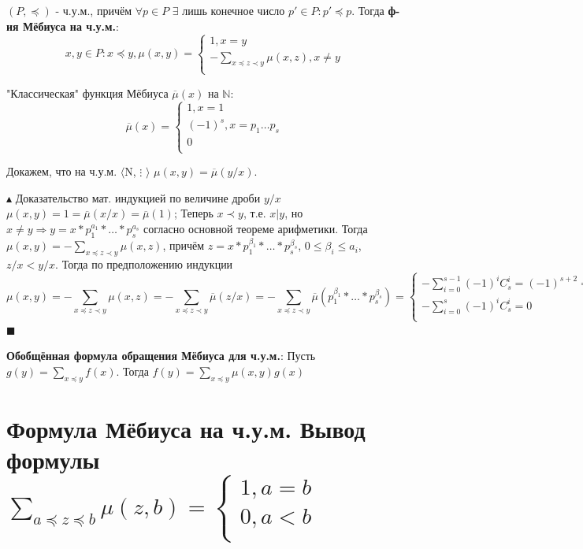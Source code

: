 $(P, \preceq)$ - ч.у.м., причём $\forall p \in P$  $\exists$ лишь конечное число $p' \in P: p' \preceq p$. Тогда \textbf{ф-ия Мёбиуса на ч.у.м.}: \[x, y \in P: x \preceq y, \mu(x, y) = \left\{
  \begin{array}{ccc}
    1, x = y \\
    - \sum_{x \preceq z \prec y} \mu(x, z), x \neq y\\
  \end{array}
\right. \] \par
"Классическая"  функция Мёбиуса $\overline{\mu}(x)$ на $ \mathbb{N}$:
\[ 
\overline{\mu}(x)= \left\{
  \begin{array}{ccc}
    1, x = 1 \\
    (-1)^s, x = p_1\dots p_ s\\
    0 \\
  \end{array}
\right.
\] \par
Докажем, что на ч.у.м. $\langle$N, $\vdots$ $\rangle$ $\mu (x, y) = \overline{\mu}(y/x)$. \par
$\blacktriangle$
Доказательство мат. индукцией по величине дроби $y/x$
$\mu (x, y) = 1 = \overline{\mu}(x/x) = \overline{\mu}(1)$;
Теперь $x \prec y$, т.е. $x|y$, но $x \neq y \Rightarrow y = x*p_1^{a_1}*\dots*p_s^{a_s}$ согласно основной теореме арифметики. Тогда 
$ \mu(x, y) = - \sum_{x \preceq z \prec y} \mu(x, z) $, причём $z = x*p_1^{\beta_1}*\dots*p_s^{\beta_s}$, $0 \leqslant \beta_i \leqslant a_i$, $z/x < y/x$. Тогда по предположению индукции 
\[ \mu(x, y) = - \sum_{x \preceq z \prec y} \mu(x, z) = - \sum_{x \preceq z \prec y} \overline{\mu}(z/x) = - \sum_{x \preceq z \prec y} \overline{\mu}(p_1^{\beta_1}*\dots*p_s^{\beta_s}) = \left\{
  \begin{array}{ccc}
   -\sum_{i=0}^{s-1} (-1)^iC_s^i = (-1)^{s+2} = (-1)^s, a_1=\dots=1 \\
   -\sum_{i=0}^{s} (-1)^iC_s^i = 0\\
  \end{array}
\right.\]
$\blacksquare$ \par
\textbf{Обобщённая формула обращения Мёбиуса для ч.у.м.}: Пусть $g(y) = \sum_{x\preceq y} f(x)$. Тогда $f(y) = \sum_{x\preceq y} \mu(x, y)g(x)$

\section{Формула Мёбиуса на ч.у.м. Вывод формулы $\sum_{a\preceq z \preceq b} \mu(z, b) = \left\{
  \begin{array}{ccc}
   1, a=b \\
   0, a<b \\
  \end{array}
\right.$}

